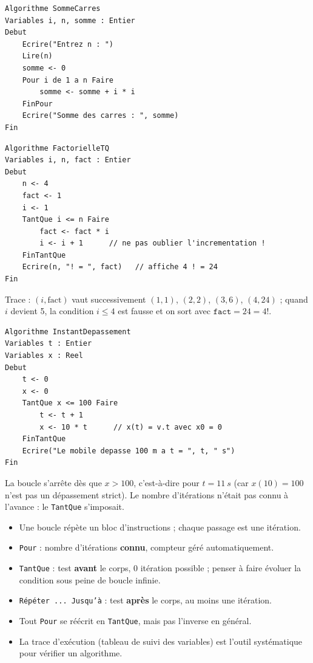 \documentclass[11pt]{article}
\newcommand{\cle}[1]{{\popxbold\color{popdark}#1}}
\begin{document}
\begin{corrige}[Exercice 1]
\begin{lstlisting}
Algorithme SommeCarres
Variables i, n, somme : Entier
Debut
    Ecrire("Entrez n : ")
    Lire(n)
    somme <- 0
    Pour i de 1 a n Faire
        somme <- somme + i * i
    FinPour
    Ecrire("Somme des carres : ", somme)
Fin
\end{lstlisting}
\end{corrige}

\begin{corrige}[Exercice 2]
\begin{lstlisting}
Algorithme FactorielleTQ
Variables i, n, fact : Entier
Debut
    n <- 4
    fact <- 1
    i <- 1
    TantQue i <= n Faire
        fact <- fact * i
        i <- i + 1      // ne pas oublier l'incrementation !
    FinTantQue
    Ecrire(n, "! = ", fact)   // affiche 4 ! = 24
Fin
\end{lstlisting}
Trace : $(i, \text{fact})$ vaut successivement $(1,1)$, $(2,2)$, $(3,6)$, $(4,24)$ ; quand $i$ devient 5, la condition $i \le 4$ est fausse et on sort avec $\texttt{fact} = 24 = 4!$.
\end{corrige}

\begin{corrige}[Exercice 3]
\begin{lstlisting}
Algorithme InstantDepassement
Variables t : Entier
Variables x : Reel
Debut
    t <- 0
    x <- 0
    TantQue x <= 100 Faire
        t <- t + 1
        x <- 10 * t      // x(t) = v.t avec x0 = 0
    FinTantQue
    Ecrire("Le mobile depasse 100 m a t = ", t, " s")
Fin
\end{lstlisting}
La boucle s'arrête dès que $x > 100$, c'est-à-dire pour $t = \SI{11}{s}$ (car $x(10) = 100$ n'est pas un dépassement strict). Le nombre d'itérations n'était pas connu à l'avance : le \texttt{TantQue} s'imposait.
\end{corrige}

\begin{aretenir}
\begin{itemize}
\item Une \cle{boucle} répète un bloc d'instructions ; chaque passage est une \cle{itération}.
\item \texttt{Pour} : nombre d'itérations \textbf{connu}, compteur géré automatiquement.
\item \texttt{TantQue} : test \textbf{avant} le corps, 0 itération possible ; penser à faire évoluer la condition sous peine de boucle infinie.
\item \texttt{Répéter ... Jusqu'à} : test \textbf{après} le corps, au moins une itération.
\item Tout \texttt{Pour} se réécrit en \texttt{TantQue}, mais pas l'inverse en général.
\item La \cle{trace d'exécution} (tableau de suivi des variables) est l'outil systématique pour vérifier un algorithme.
\end{itemize}
\end{aretenir}
\end{document}

